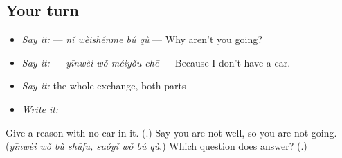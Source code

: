 \subsection*{Your turn}
\begin{itemize}
\raggedright
  \item \emph{Say it:}  — \emph{nǐ wèishénme bú qù} — Why aren't you going?
  \item \emph{Say it:}  — \emph{yīnwèi wǒ méiyǒu chē} — Because I don't have a car.
  \item \emph{Say it:} the whole exchange, both parts
  \item \emph{Write it:} 
\end{itemize}

\begin{tcolorbox}[breakable,colback=teal!4,colframe=teal!35!black,title={Before you move on}]
Give a reason with no car in it. (\textbf{}.) Say you are not well, so you are not going. (\emph{yīnwèi wǒ bù shūfu, suǒyǐ wǒ bú qù}.) Which question does  answer? (\textbf{}.)
\end{tcolorbox}
